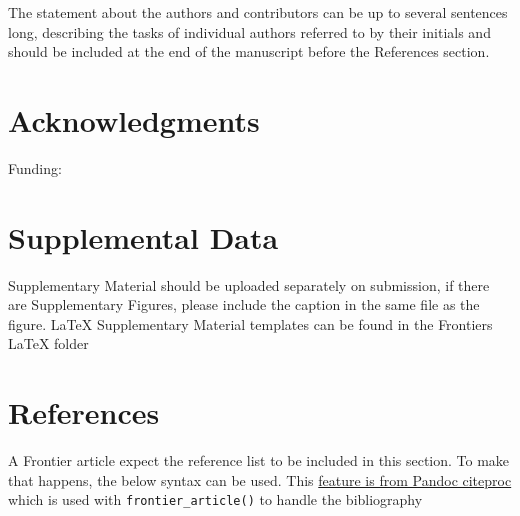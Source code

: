 \documentclass[utf8]{frontiersSCNS}
\begin{document}
The statement about the authors and contributors can be up to several
sentences long, describing the tasks of individual authors referred to
by their initials and should be included at the end of the manuscript
before the References section.

\hypertarget{acknowledgments}{%
\section*{Acknowledgments}\label{acknowledgments}}

Funding:

\hypertarget{supplemental-data}{%
\section{Supplemental Data}\label{supplemental-data}}

Supplementary Material should be uploaded separately on submission, if
there are Supplementary Figures, please include the caption in the same
file as the figure. LaTeX Supplementary Material templates can be found
in the Frontiers LaTeX folder

\hypertarget{references}{%
\section{References}\label{references}}

A Frontier article expect the reference list to be included in this
section. To make that happens, the below syntax can be used. This
\href{https://pandoc.org/MANUAL.html\#placement-of-the-bibliography}{feature
is from Pandoc citeproc} which is used with \texttt{frontier\_article()}
to handle the bibliography
\end{document}
